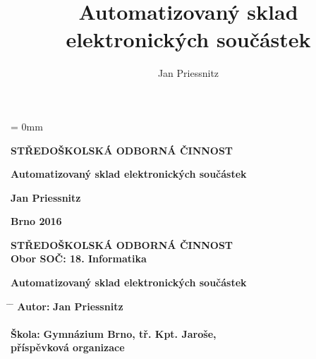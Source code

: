 \documentclass[12pt, a4paper, oneside]{article}
\author{Jan Priessnitz}
\title{Automatizovaný sklad elektronických součástek}
\begin{document}
\renewcommand{\baselinestretch}{1.5}
\hoffset = 0mm

\pagestyle{empty} %

\enlargethispage{60mm} %

\begin{center}

\Large \textbf{STŘEDOŠKOLSKÁ ODBORNÁ ČINNOST}

\vspace{60mm}

\huge %
\textbf{Automatizovaný sklad elektronických součástek}

\Large

\vspace{90mm}


\textbf{Jan Priessnitz} \\

\vspace{40mm}

\textbf{Brno 2016}


\end{center}

\newpage %

\enlargethispage{60mm} %

\begin{center}

\Large \textbf{STŘEDOŠKOLSKÁ ODBORNÁ ČINNOST}  \\
\vspace{10mm}
 \normalsize
\textbf{Obor SOČ:  18. Informatika}

\vspace{45mm}

\LARGE %
\textbf{Automatizovaný sklad elektronických součástek}
\end{center}
\large

\vspace{50mm}


\begin{tabbing}
\hspace{10mm} \= \hspace{30mm}  \=   \kill %
  \> \textbf{Autor:}  \> \textbf{Jan Priessnitz}        \\
  \>              \>                               \\[8mm]
  \> \textbf{Škola:}   \> \textbf{Gymnázium Brno, tř. Kpt. Jaroše,}     \\
  \>              \> \textbf{příspěvková organizace}    \\[8mm]

\end{tabbing}
\end{document}
